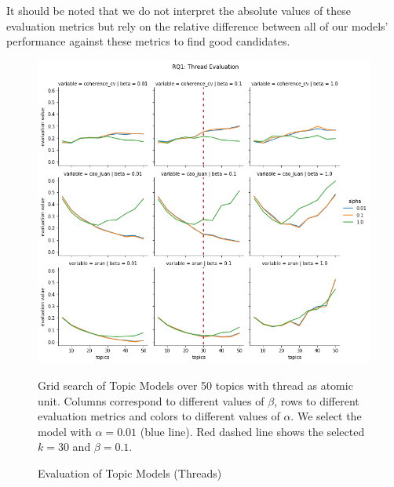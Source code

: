 \documentclass{article}
\begin{document}
It should be noted that we do not interpret the absolute values of these evaluation metrics but rely on the relative difference between all of our models' performance against these metrics to find good candidates. 

\begin{figure}[H]
    \begin{centering}
    \includegraphics[width = \textwidth]{../Figure/H1_thread_red.png}
    \caption{Evaluation of Topic Models (Threads)}
    \end{centering}
    \begin{footnotesize} 
        Grid search of Topic Models over 50 topics with thread as atomic unit. Columns correspond to different values of $\beta$, rows to different evaluation metrics and colors to different values of $\alpha$. We select the model with $\alpha = 0.01$ (blue line). Red dashed line shows the selected $k = 30$ and $\beta = 0.1$. 
    \end{footnotesize}
\end{figure}
\end{document}
